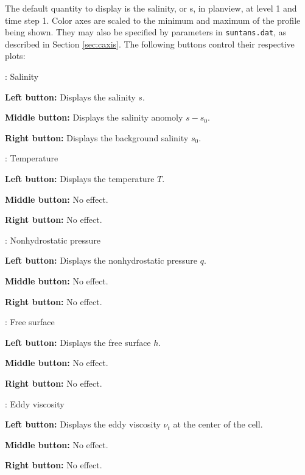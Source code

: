 The default quantity to display is the salinity, or s, in planview, at level 1 and time step 1.  Color axes
are scaled to the minimum and maximum of the profile being shown.  They may also be specified by
parameters in \verb+suntans.dat+, as described in Section \ref{sec:caxis}. The following
buttons control their respective plots:
\begin{list}{}
\item {}: Salinity
\begin{list}{}
\item {\bf Left button:} Displays the salinity $s$.
\item {\bf Middle button:} Displays the salinity anomoly $s-s_0$.
\item {\bf Right button:} Displays the background salinity $s_0$.
\end{list}
\item {}: Temperature
\begin{list}{}
\item {\bf Left button:} Displays the temperature $T$.
\item {\bf Middle button:} No effect.
\item {\bf Right button:} No effect.
\end{list}
\item {}: Nonhydrostatic pressure
\begin{list}{}
\item {\bf Left button:} Displays the nonhydrostatic pressure $q$.
\item {\bf Middle button:} No effect.
\item {\bf Right button:} No effect.
\end{list}
\item {}: Free surface
\begin{list}{}
\item {\bf Left button:} Displays the free surface $h$.
\item {\bf Middle button:} No effect.
\item {\bf Right button:} No effect.
\end{list}
\item {}:  Eddy viscosity 
\begin{list}{}
\item {\bf Left button:} Displays the eddy viscosity $\nu_t$ at the center of the cell.
\item {\bf Middle button:} No effect.
\item {\bf Right button:} No effect.
\end{list}

\end{list}
